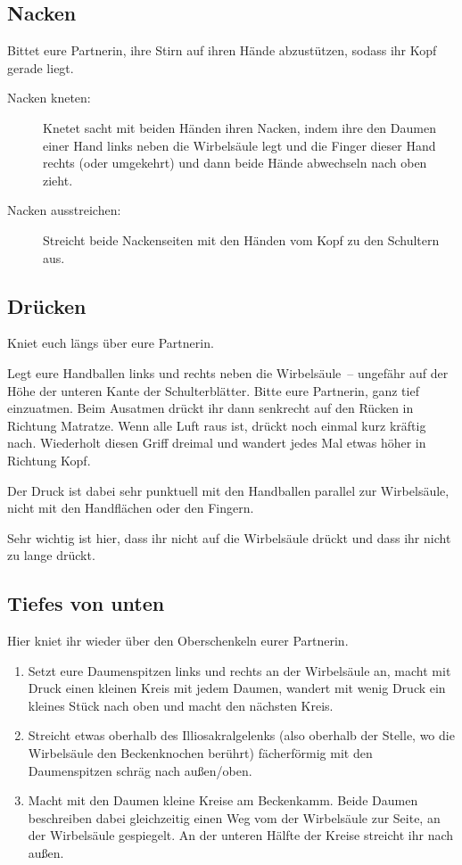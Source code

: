 \subsection{Nacken}

Bittet eure Partnerin, ihre Stirn auf ihren Hände abzustützen, sodass ihr Kopf gerade liegt.

\begin{description}
  \item[Nacken kneten:] Knetet sacht mit beiden Händen ihren Nacken, indem ihre den Daumen einer Hand links neben die Wirbelsäule legt und die Finger dieser Hand rechts (oder umgekehrt) und dann beide Hände abwechseln nach oben zieht.
  \item[Nacken ausstreichen:] Streicht beide Nackenseiten mit den Händen vom Kopf zu den Schultern aus.
\end{description}

\subsection{Drücken}

Kniet euch längs über eure Partnerin.

Legt eure Handballen links und rechts neben die Wirbelsäule~-- ungefähr auf der Höhe der unteren Kante der Schulterblätter. Bitte eure Partnerin, ganz tief einzuatmen. Beim Ausatmen drückt ihr dann senkrecht auf den Rücken in Richtung Matratze. Wenn alle Luft raus ist, drückt noch einmal kurz kräftig nach. Wiederholt diesen Griff dreimal und wandert jedes Mal etwas höher in Richtung Kopf.

Der Druck ist dabei sehr punktuell mit den Handballen parallel zur Wirbelsäule, nicht mit den Handflächen oder den Fingern.

Sehr wichtig ist hier, dass ihr nicht auf die Wirbelsäule drückt und dass ihr nicht zu lange drückt.

\subsection{Tiefes von unten}

Hier kniet ihr wieder über den Oberschenkeln eurer Partnerin.

\begin{enumerate}
  \item {} Setzt eure Daumenspitzen links und rechts an der Wirbelsäule an, macht mit Druck einen kleinen Kreis mit jedem Daumen, wandert mit wenig Druck ein kleines Stück nach oben und macht den nächsten Kreis.
  \item {} Streicht etwas oberhalb des Illiosakralgelenks (also oberhalb der Stelle, wo die Wirbelsäule den Beckenknochen berührt) fächerförmig mit den Daumenspitzen schräg nach außen/oben.
  \item {} Macht mit den Daumen kleine Kreise am Beckenkamm. Beide Daumen beschreiben dabei gleichzeitig einen Weg vom der Wirbelsäule zur Seite, an der Wirbelsäule gespiegelt. An der unteren Hälfte der Kreise streicht ihr nach außen.
\end{enumerate}


